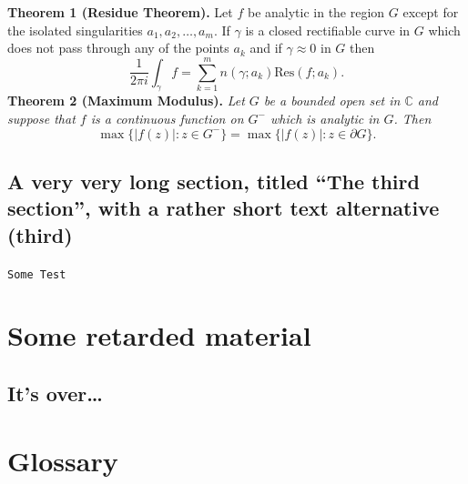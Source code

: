 \documentclass[11pt]{eapsthesis}
\begin{document}
\textbf{Theorem 1 (Residue Theorem).}
Let $f$ be analytic in the region $G$ except for the isolated singularities $a_1,a_2,\ldots,a_m$. If $\gamma$ is a closed rectifiable curve in $G$ which does not pass through any of the points $a_k$ and if $\gamma\approx 0$ in $G$ then
\[
\frac{1}{2\pi i}\int_\gamma f = \sum_{k=1}^m n(\gamma;a_k) \text{Res}(f;a_k).
\]
\textbf{Theorem 2 (Maximum Modulus).}
\emph{Let $G$ be a bounded open set in $\mathbb{C}$ and suppose that $f$ is a continuous function on $G^-$ which is analytic in $G$. Then}
\[
\max\{|f(z)|:z\in G^-\}=\max \{|f(z)|:z\in \partial G \}.
\]

\section[third]{A very very long section, titled ``The third section'', with
  a rather  short text alternative (third)}
\lipsum \texttt{Some Test}

\nocite{*}

\appendix %

\chapter{Some retarded material}
\section{It's over\dots}
\lipsum 

\backmatter

\chapter{Glossary} %

\printbibliography


\end{document}
